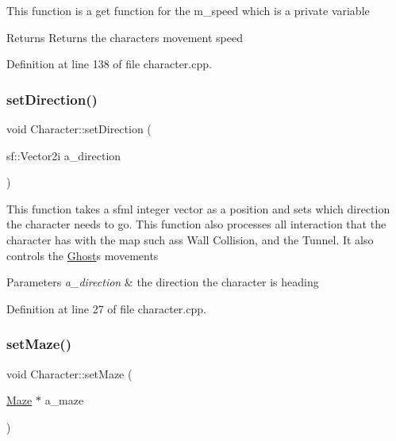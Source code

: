 This function is a get function for the m\+\_\+speed which is a private variable

\begin{DoxyReturn}{Returns}
Returns the character\textquotesingle{}s movement speed 
\end{DoxyReturn}


Definition at line 138 of file character.\+cpp.

\mbox{\label{class_character_a4af2fa47e778a3d8d6be65d728bed4e8}} 
\subsubsection{\texorpdfstring{set\+Direction()}{setDirection()}}
{\footnotesize\ttfamily void Character\+::set\+Direction (\begin{DoxyParamCaption}\item[{sf\+::\+Vector2i}]{a\+\_\+direction }\end{DoxyParamCaption})}

This function takes a sfml integer vector as a position and sets which direction the character needs to go. This function also processes all interaction that the character has with the map such ass Wall Collision, and the Tunnel. It also controls the \hyperlink{class_ghost}{Ghost}\textquotesingle{}s movements


\begin{DoxyParams}{Parameters}
{\em a\+\_\+direction} & the direction the character is heading \\
\hline
\end{DoxyParams}


Definition at line 27 of file character.\+cpp.

\mbox{\label{class_character_a4a925db15b8f68d2c8d3201ce41f5863}} 
\subsubsection{\texorpdfstring{set\+Maze()}{setMaze()}}
{\footnotesize\ttfamily void Character\+::set\+Maze (\begin{DoxyParamCaption}\item[{\hyperlink{class_maze}{Maze} $\ast$}]{a\+\_\+maze }\end{DoxyParamCaption})}


